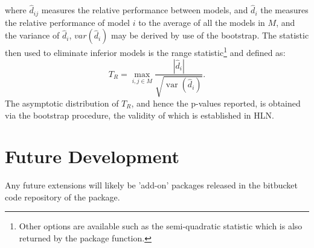 where $\hat d_{ij}$ measures the relative performance between models, and $\hat d_i$ the measures the relative performance of 
model $i$ to the average of all the models in $M$, and the variance of $\hat d_i$, $var(\hat d_i)$ may be derived by use of 
the bootstrap. The statistic then used to eliminate inferior models is the range statistic\footnote{Other options 
are available such as the semi-quadratic statistic which is also returned by
the package function.} and defined as:
\begin{equation}\label{mcs6}
{T_R} = \mathop {\max }\limits_{i,j \in M} \frac{{\left| {{{\hat d}_i}} \right|}}
{{\sqrt {\operatorname{var} \left( {{{\hat d}_i}} \right)} }}.
\end{equation}
The asymptotic distribution of $T_R$, and hence the p-values reported, is obtained via the bootstrap procedure, the validity 
of which is established in HLN. 

\section{Future Development}\label{section:fut}
Any future extensions will likely be 'add-on' packages released in the bitbucket
code repository of the package.

